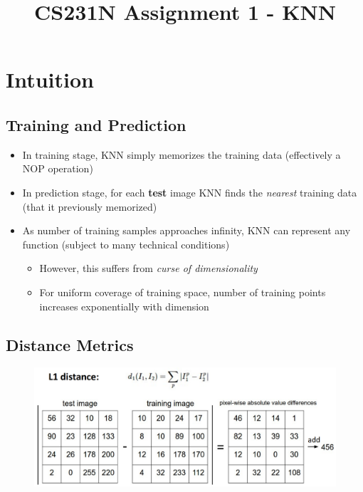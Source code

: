 \documentclass{article}
\title{\vspace{-2cm} CS231N Assignment 1 - KNN}
\date{\vspace{-5ex}}
\begin{document}
\maketitle

\section{Intuition}
\subsection{Training and Prediction}
\begin{itemize}
    \item In training stage, KNN simply memorizes the training data (effectively a NOP operation)
    \item In prediction stage, for each \textbf{test} image KNN finds the \textit{nearest} training data (that it previously memorized) 
    \item As number of training samples approaches infinity, KNN can represent any function (subject to many technical conditions)
        \begin{itemize}
            \item However, this suffers from \textit{curse of dimensionality}
            \item For uniform coverage of training space, number of training points increases exponentially with dimension
        \end{itemize}
\end{itemize}

\subsection{Distance Metrics}
\begin{figure}[htp]
    \centering
    \includegraphics[width=12cm, scale=1]{images/L1_distance.PNG}
    \caption{}
\end{figure}
\end{document}
